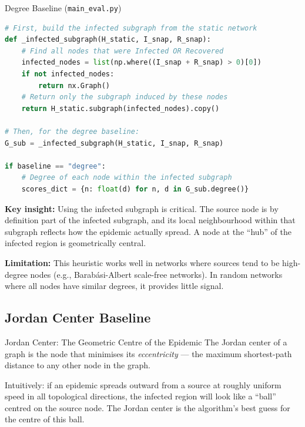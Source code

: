 \begin{codewalk}{Degree Baseline (\texttt{main\_eval.py})}
\begin{lstlisting}[language=Python]
# First, build the infected subgraph from the static network
def _infected_subgraph(H_static, I_snap, R_snap):
    # Find all nodes that were Infected OR Recovered
    infected_nodes = list(np.where((I_snap + R_snap) > 0)[0])
    if not infected_nodes:
        return nx.Graph()
    # Return only the subgraph induced by these nodes
    return H_static.subgraph(infected_nodes).copy()

# Then, for the degree baseline:
G_sub = _infected_subgraph(H_static, I_snap, R_snap)

if baseline == "degree":
    # Degree of each node within the infected subgraph
    scores_dict = {n: float(d) for n, d in G_sub.degree()}
\end{lstlisting}
\textbf{Key insight:} Using the infected subgraph is critical. The source node is by definition part of the infected subgraph, and its local neighbourhood within that subgraph reflects how the epidemic actually spread. A node at the ``hub'' of the infected region is geometrically central.

\textbf{Limitation:} This heuristic works well in networks where sources tend to be high-degree nodes (e.g., Barab{\'a}si-Albert scale-free networks). In random networks where all nodes have similar degrees, it provides little signal.
\end{codewalk}

\subsection{Jordan Center Baseline}

\begin{conceptbox}{Jordan Center: The Geometric Centre of the Epidemic}
The Jordan center of a graph is the node that minimises its \emph{eccentricity} --- the maximum shortest-path distance to any other node in the graph.

Intuitively: if an epidemic spreads outward from a source at roughly uniform speed in all topological directions, the infected region will look like a ``ball'' centred on the source node. The Jordan center is the algorithm's best guess for the centre of this ball.
\end{conceptbox}

